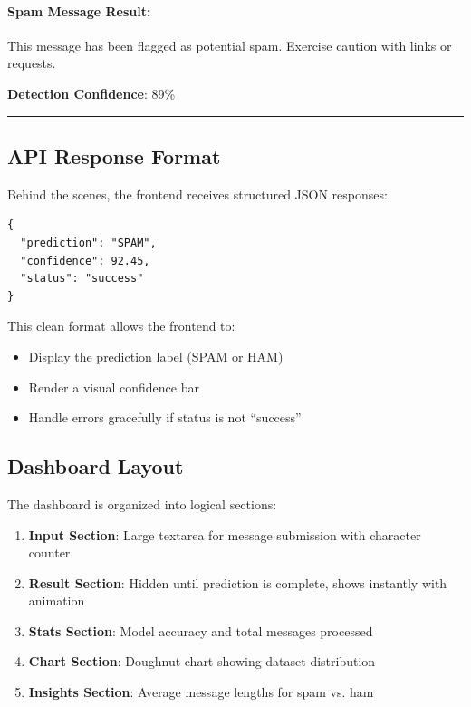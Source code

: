 \documentclass[12pt, a4paper]{article}
\begin{document}
\paragraph{Spam Message Result:}
\begin{center}
\begin{tcolorbox}[colback=white, colframe=danger, title=\textbf{⚠️ Spam Detected}]
    This message has been flagged as potential spam. Exercise caution with links or requests.
    
    \textbf{Detection Confidence}: 89\%
    
    \textcolor{danger}{\rule{0.75\textwidth}{5pt}}
\end{tcolorbox}
\end{center}

\subsection{API Response Format}

Behind the scenes, the frontend receives structured JSON responses:

\begin{verbatim}
{
  "prediction": "SPAM",
  "confidence": 92.45,
  "status": "success"
}
\end{verbatim}

This clean format allows the frontend to:
\begin{itemize}
    \item Display the prediction label (SPAM or HAM)
    \item Render a visual confidence bar
    \item Handle errors gracefully if status is not ``success''
\end{itemize}

\subsection{Dashboard Layout}

The dashboard is organized into logical sections:

\begin{enumerate}
    \item \textbf{Input Section}: Large textarea for message submission with character counter
    \item \textbf{Result Section}: Hidden until prediction is complete, shows instantly with animation
    \item \textbf{Stats Section}: Model accuracy and total messages processed
    \item \textbf{Chart Section}: Doughnut chart showing dataset distribution
    \item \textbf{Insights Section}: Average message lengths for spam vs. ham
\end{enumerate}
\end{document}
